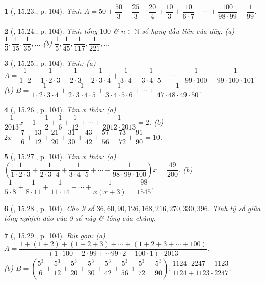 \documentclass{article}
\newtheorem{baitoan}{}
\begin{document}
\begin{baitoan}[\cite{TLCT_THCS_Toan_6_so_hoc}, 15.23., p. 104]
	Tính $A = 50 + \dfrac{50}{3} + \dfrac{25}{3} + \dfrac{20}{4} + \dfrac{10}{3} + \dfrac{10}{6\cdot7} + \cdots + \dfrac{100}{98\cdot99} + \dfrac{1}{99}$.
\end{baitoan}

\begin{baitoan}[\cite{TLCT_THCS_Toan_6_so_hoc}, 15.24., p. 104]
	Tính tổng $100$ \& $n\in\mathbb{N}$ số hạng đầu tiên của dãy: (a) $\dfrac{1}{3},\dfrac{1}{15},\dfrac{1}{35},\ldots$ (b) $\dfrac{1}{5},\dfrac{1}{45},\dfrac{1}{117},\dfrac{1}{221},\ldots$
\end{baitoan}

\begin{baitoan}[\cite{TLCT_THCS_Toan_6_so_hoc}, 15.25., p. 104]
	Tính: (a) $A = \dfrac{1}{1\cdot2} - \dfrac{1}{1\cdot2\cdot3} + \dfrac{1}{2\cdot3} - \dfrac{1}{2\cdot3\cdot4} + \dfrac{1}{3\cdot4} - \dfrac{1}{3\cdot4\cdot5} + \cdots + \dfrac{1}{99\cdot100} - \dfrac{1}{99\cdot100\cdot101}$. (b) $B = \dfrac{1}{1\cdot2\cdot3\cdot4} + \dfrac{1}{2\cdot3\cdot4\cdot5} + \dfrac{1}{3\cdot4\cdot5\cdot6} + \cdots + \dfrac{1}{47\cdot48\cdot49\cdot50}$.
\end{baitoan}

\begin{baitoan}[\cite{TLCT_THCS_Toan_6_so_hoc}, 15.26., p. 104]
	Tìm $x$ thỏa: (a) $\dfrac{1}{2013}x + 1 + \dfrac{1}{2} + \dfrac{1}{6} + \dfrac{1}{12} + \cdots + \dfrac{1}{2012\cdot2013} = 2$. (b) $2x + \dfrac{7}{6} + \dfrac{13}{12} + \dfrac{21}{20} + \dfrac{31}{30} + \dfrac{43}{42} + \dfrac{57}{56} + \dfrac{73}{72} + \dfrac{91}{90} = 10$.
\end{baitoan}

\begin{baitoan}[\cite{TLCT_THCS_Toan_6_so_hoc}, 15.27., p. 104]
	Tìm $x$ thỏa: (a) $\left(\dfrac{1}{1\cdot2\cdot3} + \dfrac{1}{2\cdot3\cdot4} + \dfrac{1}{3\cdot4\cdot5} + \cdots + \dfrac{1}{98\cdot99\cdot100}\right)x = \dfrac{49}{200}$. (b) $\dfrac{1}{5\cdot8} + \dfrac{1}{8\cdot11} + \dfrac{1}{11\cdot14} + \cdots + \dfrac{1}{x(x + 3)} = \dfrac{98}{1545}$.
\end{baitoan}

\begin{baitoan}[\cite{TLCT_THCS_Toan_6_so_hoc}, 15.28., p. 104]
	Cho 9 số $36,60,90,126,168,216,270,330,396$. Tính tỷ số giữa tổng nghịch đảo của 9 số này \& tổng của chúng.
\end{baitoan}

\begin{baitoan}[\cite{TLCT_THCS_Toan_6_so_hoc}, 15.29., p. 104]
	Rút gọn: (a) $A = \dfrac{1 + (1 + 2) + (1 + 2 + 3) + \cdots + (1 + 2 + 3 + \cdots + 100)}{(1\cdot100 + 2\cdot99 + \cdots 99\cdot2 + 100\cdot1)\cdot2013}$.\\(b) $B = \left(\dfrac{5^3}{6} + \dfrac{5^3}{12} + \dfrac{5^3}{20} + \dfrac{5^3}{30} + \dfrac{5^3}{42} + \dfrac{5^3}{56} + \dfrac{5^3}{72} + \dfrac{5^3}{90}\right):\dfrac{1124\cdot2247 - 1123}{1124 + 1123\cdot2247}$.
\end{baitoan}
\end{document}
